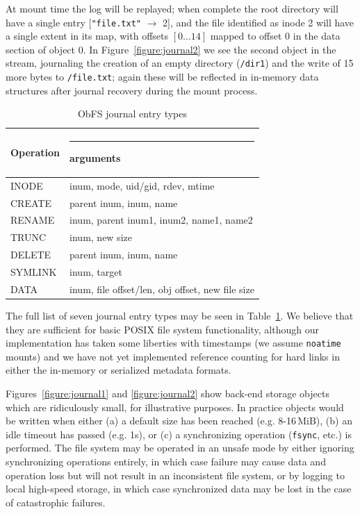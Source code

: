 \documentclass[sigconf,anonymous,10pt]{acmart}
\begin{document}
\begin{CCSXML}
At mount time the log will be replayed; when complete the root directory will have a single entry [\texttt{"file.txt"} $\rightarrow$ 2], and the file identified as inode 2 will have a single extent in its map, with offsets $[0\ldots 14]$ mapped to offset 0 in the data section of object 0.
In Figure~\ref{figure:journal2} we see the second object in the stream, journaling the creation of an empty directory (\texttt{/dir1}) and the write of 15 more bytes to \texttt{/file.txt}; again these will be reflected in in-memory data structures after journal recovery during the mount process.

\begin{table}
  \begin{tabular}{l|l}
    Operation & \rule{4em}{0pt} arguments \\
    \hline
    INODE & inum, mode, uid/gid, rdev, mtime \\
    CREATE & parent inum, inum, name \\
    RENAME & inum, parent inum1, inum2, name1, name2 \\
    TRUNC & inum, new size\\
    DELETE & parent inum, inum, name \\
    SYMLINK & inum, target\\
    DATA & inum, file offset/len, obj offset, new file size\\
    \hline
  \end{tabular} \vspace{0.5\baselineskip}
  \caption{ObFS journal entry types}
  \label{table:journal}
\end{table}

The full list of seven journal entry types may be seen in Table~\ref{table:journal}.
We believe that they are sufficient for basic POSIX file system functionality, although our implementation has taken some liberties with timestamps (we assume \texttt{noatime} mounts) and we have not yet implemented reference counting for hard links in either the in-memory or serialized metadata formats.

Figures~\ref{figure:journal1} and \ref{figure:journal2} show back-end storage objects which are ridiculously small, for illustrative purposes.
In practice objects would be written when either (a) a default size has been reached (e.g. 8-16\,MiB), (b) an idle timeout has passed (e.g. 1s), or (c) a synchronizing operation (\texttt{fsync}, etc.) is performed.
The file system may be operated in an unsafe mode by either ignoring synchronizing operations entirely, in which case failure may cause data and operation loss but will not result in an inconsistent file system, or by logging to local high-speed storage, in which case synchronized data may be lost in the case of catastrophic failures.


\end{CCSXML}
\end{document}
